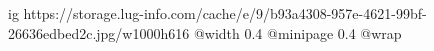  
 
 
 
 

\ifcmt
  ig https://storage.lug-info.com/cache/e/9/b93a4308-957e-4621-99bf-26636edbed2c.jpg/w1000h616
  @width 0.4
  @minipage 0.4
  @wrap \parpic[r]
\fi
